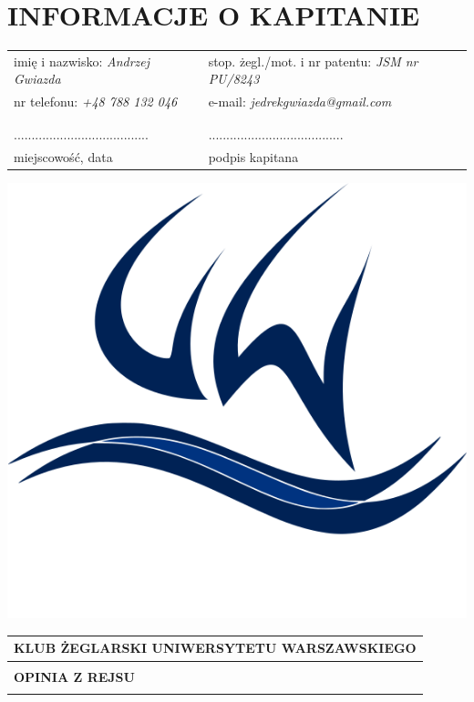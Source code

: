 \documentclass{article}
\begin{document}
\section*{INFORMACJE O KAPITANIE}

\begin{tabularx}{\textwidth}{X X}
imię i nazwisko: \textit{Andrzej Gwiazda} & stop. żegl./mot. i nr patentu: \textit{JSM nr PU/8243}\\
nr telefonu: \textit{+48 788 132 046} & e-mail: \textit{jedrekgwiazda@gmail.com}\\
\\\\
...................................... & ......................................\\
miejscowość, data & podpis kapitana\\
\end{tabularx}
\newpage
\begin{minipage}{0.11\textwidth}
\includegraphics[width=\textwidth]{logo.png}
\end{minipage}
\begin{minipage}{0.89\textwidth}
\begin{tabularx}{\textwidth} { 
  | >{\centering\arraybackslash}X | }
 \hline
 \textbf{KLUB ŻEGLARSKI UNIWERSYTETU WARSZAWSKIEGO} \\
 \hline
 \\
 \textbf{\huge OPINIA Z REJSU} \\
 \\
\hline
\end{tabularx}
\end{minipage}
\end{document}
